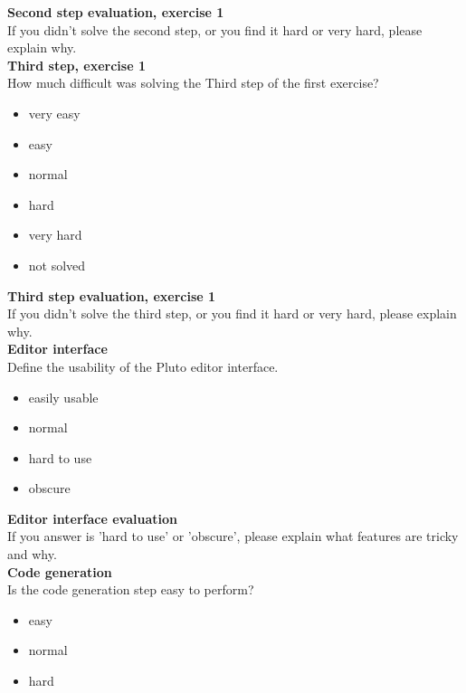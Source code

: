 \textbf{Second step evaluation, exercise 1}
\\

If you didn't solve the second step, or you find it hard or very hard, please explain why.
\\

\textbf{Third step, exercise 1}
\\

How much difficult was solving the Third step of the first exercise?


\begin{itemize}
\item{very easy}
\item{easy}
\item{normal}
\item{hard}
\item{very hard}
\item{not solved}

\end{itemize}


\textbf{Third step evaluation, exercise 1}
\\

If you didn't solve the third step, or you find it hard or very hard, please explain why.
\\ 

\textbf{Editor interface}
\\

Define the usability of the Pluto editor interface.


\begin{itemize}
\item{easily usable}
\item{normal}
\item{hard to use}
\item{obscure}

\end{itemize}

\textbf{Editor interface evaluation}
\\

If you answer is 'hard to use' or 'obscure', please explain what features are tricky and why.
\\ 

\textbf{Code generation}
\\

Is the code generation step easy to perform?


\begin{itemize}
\item{easy}
\item{normal}
\item{hard}

\end{itemize}

